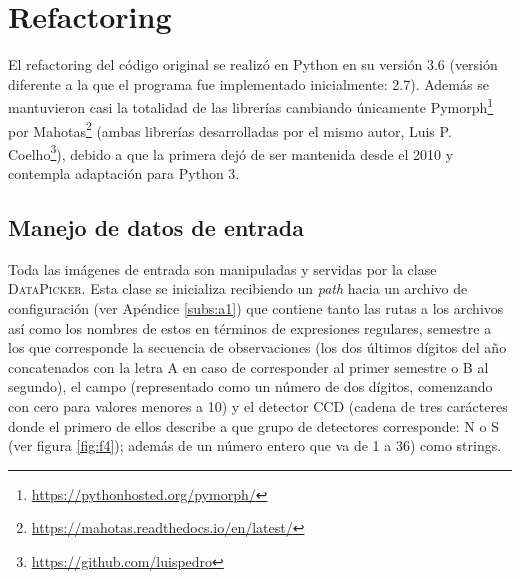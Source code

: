 \chapter{Refactoring}
\label{ch:refactoring}
El refactoring del c\'odigo original se realiz\'o en Python en su versi\'on 3.6 (versi\'on diferente a la que el programa fue implementado inicialmente: 2.7). Adem\'as se mantuvieron casi la totalidad de las librer\'ias cambiando \'unicamente Pymorph\footnote{\url{https://pythonhosted.org/pymorph/}} por Mahotas\footnote{\url{https://mahotas.readthedocs.io/en/latest/}} (ambas librer\'ias desarrolladas por el mismo autor, Luis P. Coelho\footnote{\url{https://github.com/luispedro}}), debido a que la primera dej\'o de ser mantenida desde el 2010 y contempla adaptaci\'on para Python 3.   

\section{Manejo de datos de entrada}
Toda las im\'agenes de entrada son manipuladas y servidas por la clase \textsc{DataPicker}. Esta clase se inicializa recibiendo un \textit{path} hacia un archivo de configuraci\'on (ver Ap\'endice \ref{subs:a1}) que contiene tanto las rutas a los archivos as\'i como los nombres de estos en t\'erminos de expresiones regulares, semestre a los que corresponde la secuencia de observaciones (los dos \'ultimos d\'igitos del a\~no concatenados con la letra A en caso de corresponder al primer semestre o B al segundo), el campo (representado como un n\'umero de dos d\'igitos, comenzando con cero para valores menores a 10) y el detector CCD (cadena de tres car\'acteres donde el primero de ellos describe a que grupo de detectores corresponde: N o S (ver figura \ref{fig:f4}); adem\'as de un n\'umero entero que va de 1 a 36) como strings. 
\bigskip

